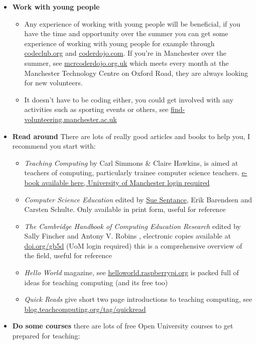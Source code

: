\documentclass[
  12pt,
]{book}
\providecommand{\tightlist}{%
  \setlength{\itemsep}{0pt}\setlength{\parskip}{0pt}}
\begin{document}
\begin{itemize}
\tightlist
\item
  \textbf{Work with young people}

  \begin{itemize}
  \tightlist
  \item
    Any experience of working with young people will be beneficial, if you have the time and opportunity over the summer you can get some experience of working with young people for example through \href{https://codeclub.org/}{codeclub.org} and \href{https://coderdojo.com/}{coderdojo.com}. If you're in Manchester over the summer, see \href{https://mcrcoderdojo.org.uk/}{mcrcoderdojo.org.uk} which meets every month at the Manchester Technology Centre on Oxford Road, they are always looking for new volunteers.
  \item
    It doesn't have to be coding either, you could get involved with any activities such as sporting events or others, see \href{https://find-volunteering.manchester.ac.uk/}{find-volunteering.manchester.ac.uk}
  \end{itemize}
\item
  \textbf{Read around} There are lots of really good articles and books to help you, I recommend you start with:

  \begin{itemize}
  \tightlist
  \item
    \emph{Teaching Computing} \citep{teachingcomputing} by Carl Simmons \& Claire Hawkins, is aimed at teachers of computing, particularly trainee computer science teachers. \href{http://dx.doi.org.manchester.idm.oclc.org/10.4135/9781473919785}{e-book available here, University of Manchester login required}
  \item
    \emph{Computer Science Education} \citep{cse} edited by \href{https://en.wikipedia.org/wiki/Sue_Sentance}{Sue Sentance}, Erik Barendsen and Carsten Schulte. Only available in print form, useful for reference
  \item
    \emph{The Cambridge Handbook of Computing Education Research} edited by Sally Fincher and Antony V. Robins \citep{CERhandbook}, electronic copies available at \href{https://doi.org/gb5d}{doi.org/gb5d} (UoM login required) this is a comprehensive overview of the field, useful for reference
  \item
    \emph{Hello World} magazine, see \href{https://helloworld.raspberrypi.org/}{helloworld.raspberrypi.org} is packed full of ideas for teaching computing (and its free too)
  \item
    \emph{Quick Reads} give short two page introductions to teaching computing, see \href{https://blog.teachcomputing.org/tag/quickread/}{blog.teachcomputing.org/tag/quickread}
  \end{itemize}
\item
  \textbf{Do some courses} there are lots of free Open University courses to get prepared for teaching:


\end{itemize}
\end{document}
